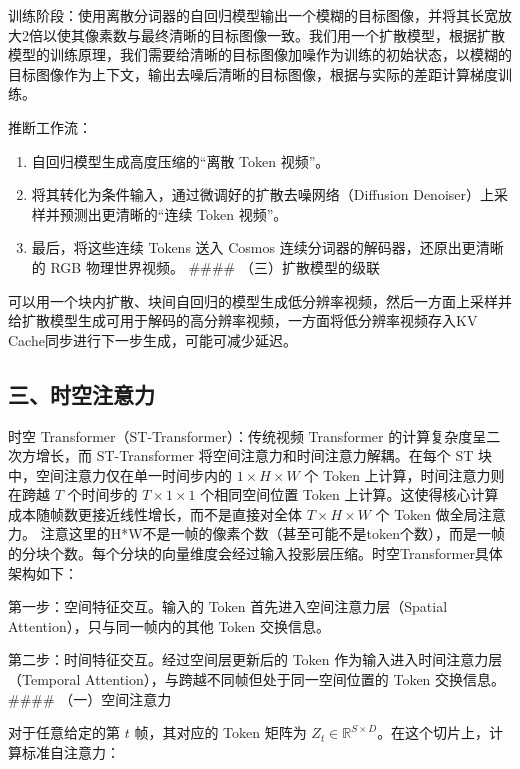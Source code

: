 训练阶段：使用离散分词器的自回归模型输出一个模糊的目标图像，并将其长宽放大2倍以使其像素数与最终清晰的目标图像一致。我们用一个扩散模型，根据扩散模型的训练原理，我们需要给清晰的目标图像加噪作为训练的初始状态，以模糊的目标图像作为上下文，输出去噪后清晰的目标图像，根据与实际的差距计算梯度训练。

推断工作流：

\begin{enumerate}
\def\labelenumi{\arabic{enumi}.}
\item
  自回归模型生成高度压缩的``离散 Token 视频''。
\item
  将其转化为条件输入，通过微调好的扩散去噪网络（Diffusion Denoiser）上采样并预测出更清晰的``连续 Token 视频''。
\item
  最后，将这些连续 Tokens 送入 Cosmos 连续分词器的解码器，还原出更清晰的 RGB 物理世界视频。
  \#\#\#\# （三）扩散模型的级联
\end{enumerate}

可以用一个块内扩散、块间自回归的模型生成低分辨率视频，然后一方面上采样并给扩散模型生成可用于解码的高分辨率视频，一方面将低分辨率视频存入KV Cache同步进行下一步生成，可能可减少延迟。

\hypertarget{ux4e09ux65f6ux7a7aux6ce8ux610fux529b}{%
\subsection{三、时空注意力}\label{ux4e09ux65f6ux7a7aux6ce8ux610fux529b}}

时空 Transformer（ST-Transformer）：传统视频 Transformer 的计算复杂度呈二次方增长，而 ST-Transformer 将空间注意力和时间注意力解耦。在每个 ST 块中，空间注意力仅在单一时间步内的 \(1\times H\times W\) 个 Token 上计算，时间注意力则在跨越 \(T\) 个时间步的 \(T\times 1\times 1\) 个相同空间位置 Token 上计算。这使得核心计算成本随帧数更接近线性增长，而不是直接对全体 \(T\times H\times W\) 个 Token 做全局注意力。
注意这里的H*W不是一帧的像素个数（甚至可能不是token个数），而是一帧的分块个数。每个分块的向量维度会经过输入投影层压缩。时空Transformer具体架构如下：

第一步：空间特征交互。输入的 Token 首先进入空间注意力层（Spatial Attention），只与同一帧内的其他 Token 交换信息。

第二步：时间特征交互。经过空间层更新后的 Token 作为输入进入时间注意力层（Temporal Attention），与跨越不同帧但处于同一空间位置的 Token 交换信息。
\#\#\#\# （一）空间注意力

对于任意给定的第 \(t\) 帧，其对应的 Token 矩阵为 \(Z_t\in\mathbb{R}^{S\times D}\)。在这个切片上，计算标准自注意力：

